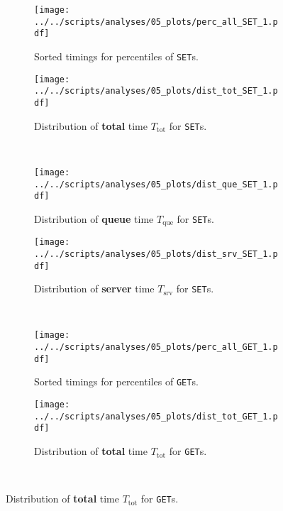 \documentclass[11pt]{article}
\theoremstyle{definition}
\newcommand\Ttot{T_{\mathrm{tot}}}
\newcommand\Tque{T_{\mathrm{que}}}
\newcommand\Tsrv{T_{\mathrm{srv}}}
\renewcommand\b[1]{{\bf{#1}}}
\renewcommand\t\texttt
\begin{document}
\begin{figure}[!h]
    \newcommand\wdt{7.4cm}
    \centering
    \begin{subfigure}[t]{\wdt}
        \centering
        \texttt{[image: ../../scripts/analyses/05\_plots/perc\_all\_SET\_1.pdf]}
        \caption{Sorted timings for percentiles of \t{SET}s.}\label{fig:05_breakdown-srt-set-1}
    \end{subfigure}
    \hspace{0.2cm}
    \begin{subfigure}[t]{\wdt}
        \centering
        \texttt{[image: ../../scripts/analyses/05\_plots/dist\_tot\_SET\_1.pdf]}
        \caption{Distribution of \b{total} time $\Ttot$ for \t{SET}s.}\label{fig:05_breakdown-tot-set-1}
    \end{subfigure}
    \\\vspace{3mm}
    \begin{subfigure}[t]{\wdt}
        \centering
        \texttt{[image: ../../scripts/analyses/05\_plots/dist\_que\_SET\_1.pdf]}
        \caption{Distribution of \b{queue} time $\Tque$ for \t{SET}s.}\label{fig:05_breakdown-que-set-1}
    \end{subfigure}
    \hspace{0.2cm}
    \begin{subfigure}[t]{\wdt}
        \centering
        \texttt{[image: ../../scripts/analyses/05\_plots/dist\_srv\_SET\_1.pdf]}
        \caption{Distribution of \b{server} time $\Tsrv$ for \t{SET}s.}\label{fig:05_breakdown-srv-set-1}
    \end{subfigure}
    \\\vspace{3mm}
    \begin{subfigure}[t]{\wdt}
        \centering
        \texttt{[image: ../../scripts/analyses/05\_plots/perc\_all\_GET\_1.pdf]}
        \caption{Sorted timings for percentiles of \t{GET}s.}\label{fig:05_breakdown-srt-get-1}
    \end{subfigure}
    \hspace{0.2cm}
    \begin{subfigure}[t]{\wdt}
        \centering
        \texttt{[image: ../../scripts/analyses/05\_plots/dist\_tot\_GET\_1.pdf]}
        \caption{Distribution of \b{total} time $\Ttot$ for \t{GET}s.}\label{fig:05_breakdown-tot-get-1}
    \end{subfigure}
    \\\vspace{3mm}

\end{figure}
\end{document}
